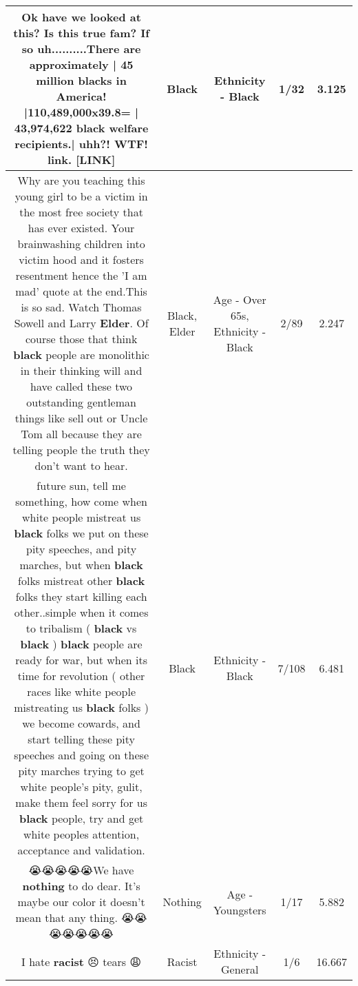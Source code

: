 \documentclass[11pt]{article}
\newlength\mylength
\begin{document}
\begin{center}
\begin{longtable}{|C{.65\mylength}|C{.30\mylength}|C{.12\mylength}|C{.12\mylength}|C{.12\mylength}|}
  \small Ok have we looked at this? Is this true fam? If so uh..........There are approximately | 45 million blacks in America! |110,489,000x39.8= | 43,974,622 \textbf{black} welfare recipients.| uhh?! WTF! link.  [LINK] \normalsize   & Black & Ethnicity - Black & 1/32 & 3.125 \\  \hline
  \small Why are you teaching this young girl to be a victim in the most free society that has ever existed. Your brainwashing children into victim hood and it fosters resentment hence the 'I am mad' quote at the end.This is so sad. Watch Thomas Sowell and Larry \textbf{Elder}. Of course those that think \textbf{black} people are monolithic in their thinking will and have called these two outstanding gentleman things like sell out or Uncle Tom all because they are telling people the truth they don't want to hear.\normalsize   & Black, Elder & Age - Over 65s, Ethnicity - Black & 2/89 & 2.247 \\  \hline
  \small future sun, tell me something, how come when white people mistreat us \textbf{black} folks we put on these pity speeches, and pity marches, but when \textbf{black} folks mistreat other \textbf{black} folks they start killing each other..simple when it comes to tribalism ( \textbf{black} vs \textbf{black} ) \textbf{black} people are ready for war, but when its time for revolution ( other races like white people mistreating us \textbf{black} folks ) we become cowards, and start telling these pity speeches and going on these pity marches trying to get white people's pity, gulit, make them feel sorry for us \textbf{black} people, try and get white peoples attention, acceptance and validation.\normalsize   & Black & Ethnicity - Black & 7/108 & 6.481 \\  \hline
  \small 😭😭😭😭😭We have \textbf{nothing} to do dear. It's maybe our color it doesn't mean that any thing. 😭😭😭😭😭😭😭\normalsize   & Nothing & Age - Youngsters & 1/17 & 5.882 \\  \hline
  \small I hate \textbf{racist} 😣 tears 😩\normalsize   & Racist & Ethnicity - General & 1/6 & 16.667 \\  \hline

\end{longtable}
\end{center}
\end{document}

